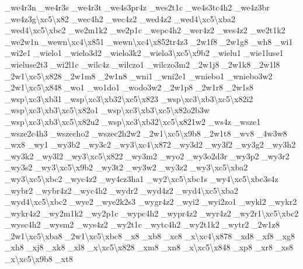 \begin{DoxyCompactItemize}
\-\_\-we4r3n \-\_\-we4r3s \-\_\-we4r3t \-\_\-we4s3pr4z \-\_\-wes2t1c \-\_\-we4s3tc4h2 \-\_\-we4z3br \-\_\-we4z3g\textbackslash{}xc5\textbackslash{}x82 \-\_\-wec4h2 \-\_\-wec4z2 \-\_\-wed4z2 \-\_\-wed4\textbackslash{}xc5\textbackslash{}xba2 \-\_\-wed4\textbackslash{}xc5\textbackslash{}xbc2 \-\_\-we2m1k2 \-\_\-we2p1c \-\_\-wepc4h2 \-\_\-wer4z2 \-\_\-wes4z2 \-\_\-we2t1k2 \-\_\-we2w1n \-\_\-wewn\textbackslash{}xc4\textbackslash{}x851 \-\_\-wewn\textbackslash{}xc4\textbackslash{}x852tr4z3 \-\_\-2w1f8 \-\_\-2w1g8 \-\_\-wh8 \-\_\-wi1 \-\_\-wi2e1 \-\_\-wielo1 \-\_\-wielo3d2 \-\_\-wielo3k2 \-\_\-wielo3\textbackslash{}xc5\textbackslash{}x9b2 \-\_\-wielu1 \-\_\-wie1luse1 \-\_\-wieluse2t3 \-\_\-wi2l1c \-\_\-wilc4z \-\_\-wilczo1 \-\_\-wilczo3m2 \-\_\-2w1j8 \-\_\-2w1k8 \-\_\-2w1l8 \-\_\-2w1\textbackslash{}xc5\textbackslash{}x828 \-\_\-2w1m8 \-\_\-2w1n8 \-\_\-wni1 \-\_\-wni2e1 \-\_\-wniebo1 \-\_\-wniebo3w2 \-\_\-2w1\textbackslash{}xc5\textbackslash{}x848 \-\_\-wo1 \-\_\-wo1do1 \-\_\-wodo3w2 \-\_\-2w1p8 \-\_\-2w1r8 \-\_\-2w1s8 \-\_\-wsp\textbackslash{}xc3\textbackslash{}xb31 \-\_\-wsp\textbackslash{}xc3\textbackslash{}xb32\textbackslash{}xc5\textbackslash{}x823 \-\_\-wsp\textbackslash{}xc3\textbackslash{}xb3\textbackslash{}xc5\textbackslash{}x82i2 \-\_\-wsp\textbackslash{}xc3\textbackslash{}xb3\textbackslash{}xc5\textbackslash{}x82o1 \-\_\-wsp\textbackslash{}xc3\textbackslash{}xb3\textbackslash{}xc5\textbackslash{}x82o2b3w \-\_\-wsp\textbackslash{}xc3\textbackslash{}xb3\textbackslash{}xc5\textbackslash{}x82u2 \-\_\-wsp\textbackslash{}xc3\textbackslash{}xb32\textbackslash{}xc5\textbackslash{}x821w2 \-\_\-ws4z \-\_\-wsze1 \-\_\-wsze2c4h3 \-\_\-wszecho2 \-\_\-wszec2h2w2 \-\_\-2w1\textbackslash{}xc5\textbackslash{}x9b8 \-\_\-2w1t8 \-\_\-wv8 \-\_\-4w3w8 \-\_\-wx8 \-\_\-wy1 \-\_\-wy3b2 \-\_\-wy3c2 \-\_\-wy3\textbackslash{}xc4\textbackslash{}x872 \-\_\-wy3d2 \-\_\-wy3f2 \-\_\-wy3g2 \-\_\-wy3h2 \-\_\-wy3k2 \-\_\-wy3l2 \-\_\-wy3\textbackslash{}xc5\textbackslash{}x822 \-\_\-wy3m2 \-\_\-wyo2 \-\_\-wy3o2d3r \-\_\-wy3p2 \-\_\-wy3r2 \-\_\-wy3s2 \-\_\-wy3\textbackslash{}xc5\textbackslash{}x9b2 \-\_\-wy3t2 \-\_\-wy3w2 \-\_\-wy3z2 \-\_\-wy3\textbackslash{}xc5\textbackslash{}xba2 \-\_\-wy3\textbackslash{}xc5\textbackslash{}xbc2 \-\_\-wyc4z2 \-\_\-wy4cz3ha1 \-\_\-wy2\textbackslash{}xc5\textbackslash{}xbc1s \-\_\-wy4\textbackslash{}xc5\textbackslash{}xbc3s4z \-\_\-wybr2 \-\_\-wybr4z2 \-\_\-wyc4h2 \-\_\-wydr2 \-\_\-wyd4z2 \-\_\-wyd4\textbackslash{}xc5\textbackslash{}xba2 \-\_\-wyd4\textbackslash{}xc5\textbackslash{}xbc2 \-\_\-wye2 \-\_\-wye2k2s3 \-\_\-wygr4z2 \-\_\-wyi2 \-\_\-wyi2zo1 \-\_\-wykl2 \-\_\-wykr2 \-\_\-wykr4z2 \-\_\-wy2m1k2 \-\_\-wy2p1c \-\_\-wypc4h2 \-\_\-wypr4z2 \-\_\-wyr4z2 \-\_\-wy2r1\textbackslash{}xc5\textbackslash{}xbc2 \-\_\-wysc4h2 \-\_\-wysm2 \-\_\-wys4z2 \-\_\-wy2t1c \-\_\-wytc4h2 \-\_\-wy2t1k2 \-\_\-wytr2 \-\_\-2w1z8 \-\_\-2w1\textbackslash{}xc5\textbackslash{}xba8 \-\_\-2w1\textbackslash{}xc5\textbackslash{}xbc8 \-\_\-x8 \-\_\-xb8 \-\_\-xc8 \-\_\-x\textbackslash{}xc4\textbackslash{}x878 \-\_\-xd8 \-\_\-xf8 \-\_\-xg8 \-\_\-xh8 \-\_\-xj8 \-\_\-xk8 \-\_\-xl8 \-\_\-x\textbackslash{}xc5\textbackslash{}x828 \-\_\-xm8 \-\_\-xn8 \-\_\-x\textbackslash{}xc5\textbackslash{}x848 \-\_\-xp8 \-\_\-xr8 \-\_\-xs8 \-\_\-x\textbackslash{}xc5\textbackslash{}x9b8 \-\_\-xt8 
\end{DoxyCompactItemize}
